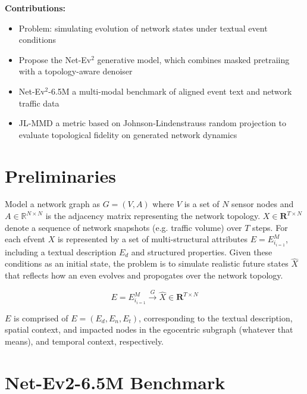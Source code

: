 \documentclass[11pt]{article}
\begin{document}
\textbf{Contributions:}
\begin{itemize}
  \item Problem: simulating evolution of network states under textual event conditions
  \item Propose the Net-Ev$^2$ generative model, which combines masked pretraiing with a topology-aware denoiser
  \item Net-Ev$^2$-6.5M a multi-modal benchmark of aligned event text and network traffic data
  \item JL-MMD a metric based on Johnson-Lindenstrauss random projection to evaluate topological fidelity on generated network dynamics
\end{itemize}

\section{Preliminaries}

Model a network graph as $G=(V,A)$ where $V$ is a set of $N$ sensor nodes and $A\in\mathbb{R}^{N\times N}$ is the adjacency matrix representing the network topology. $X\in \mathbf{R}^{T\times N}$ denote a sequence of network snapshots (e.g. traffic volume) over $T$ steps. For each efvent $X$ is represented by a set of multi-structural attributes $E=E_{i_{i=1}}^M$, including a textual description $E_d$ and structured properties. Given these conditions as an initial state, the problem is to simulate realistic future states $\hat{X}$ that reflects how an even evolves and propogates over the network topology. 

$$E=E_{i_{i=1}}^M\overset{G}{\rightarrow} \hat{X}\in\mathbf{R}^{T\times N}$$

$E$ is comprised of $E=(E_d, E_n, E_t)$, corresponding to the textual description, spatial context, and impacted nodes in the egocentric subgraph (whatever that means), and temporal context, respectively.

\section{Net-Ev2-6.5M Benchmark}
\end{document}

